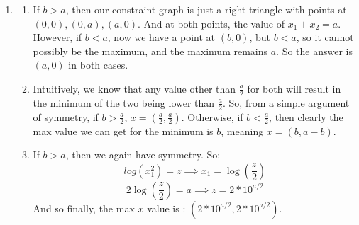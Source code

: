 \begin{enumerate}
  \item 
    \begin{enumerate}
      \item If $b > a$, then our constraint graph is just a right triangle with points at $(0,0), (0,a), (a,0)$. And at both points, the value of $x_1+x_2 = a$. However, if $b < a$, now we have a point at $(b,0)$, but $b < a$, so it cannot possibly be the maximum, and the maximum remains $a$. So the answer is $(a,0)$ in both cases.
      \item Intuitively, we know that any value other than $\frac{a}{2}$ for both will result in the minimum of the two being lower than $\frac{a}{2}$. So, from a simple argument of symmetry, if $b > \frac{a}{2}$, $x = (\frac{a}{2}, \frac{a}{2})$. Otherwise, if $b < \frac{a}{2}$, then clearly the max value we can get for the minimum is $b$, meaning $x = (b, a-b)$.
      \item If $b > a$, then we again have symmetry. So:
        $$log(x_1^2) = z \implies x_1 = \log(\frac{z}{2})$$
        $$2\log(\frac{z}{2}) = a \implies z = 2*10^{a/2}$$
        And so finally, the max $x$ value is : $(2*10^{a/2}, 2*10^{a/2})$.        
    \end{enumerate}
\end{enumerate}


